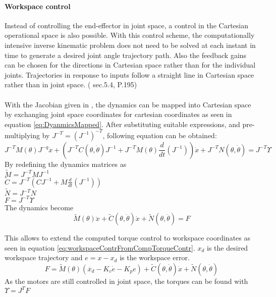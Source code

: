 \paragraph{Workspace control}
Instead of controlling the end-effector in joint space, a control in the Cartesian operational space is also possible. 
With this control scheme, the computationally intensive inverse kinematic problem does not need to be solved at each instant in time to generate a desired joint angle trajectory path. Also the feedback gains can be chosen for the directions in Cartesian space rather than for the individual joints. Trajectories in response to inputs follow a straight line in Cartesian space rather than in joint space. (\cite{MathIntroRobManip} sec.5.4, P.195)\\
\\
With the Jacobian given in , the dynamics can be mapped into Cartesian space by exchanging joint space coordinates for cartesian coordinates as seen in equation \ref{eq:DyanmicsMapped}. After substituting suitable expressions, and pre-multiplying by $ J^{-T} = (J^{-1})^{-T}$, following equation can be obtained:\\
\begin{equation} \label{eq:DyanmicsMapped}
	J^{-T} M(\theta) J^{-q} \ddot{x} + (J^{-T} C(\theta,\dot{\theta}) J^{-1} +J^{-T} M(\theta) \frac{d}{dt} (J^{-1}))\dot{x} + J^{-T} N(\theta, \dot{\theta}) = J^{-T}  \Upsilon
\end{equation}
By redefining the dynamics matrices as\\
$ \tilde{M} = J^{-T} M J^{-1}$\\
$ \tilde{C} = J^{-T} (C J^{-1} + M \frac{d}{dt} (J^{-1}))$\\
$ \tilde{N} = J^{-T} N$\\
$ F = J^{-T} \Upsilon$\\
The dynamics become\\

\begin{equation}
	\tilde{M} (\theta) \ddot{x} + \tilde{C} (\theta, \dot{\theta}) \dot{x} + \tilde{N} (\theta,\dot{\theta}) = F
\end{equation}

This allows to extend the computed torque control to workspace coordinates as seen in equation \ref{eq:workspaceContrFromCompTorqueContr}. $x_d$ is the desired workspace trajectory and $ e=x-x_d$ is the workspace error. 
\begin{equation} \label{eq:workspaceContrFromCompTorqueContr}
	F=\tilde{M} (\theta) (\ddot{x_d} - K_v \dot{e} - K_p e ) + \tilde{C}(\theta,\dot{\theta})\dot{x} + \tilde{N}(\theta,\dot{\theta})
\end{equation}
As the motors are still controlled in joint space, the torques can be found with \\
$\Upsilon = J^T F$\\


